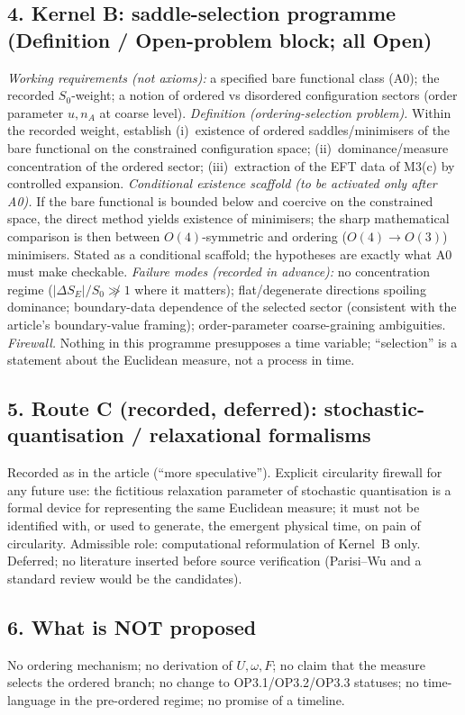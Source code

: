 \subsection*{4. Kernel B: saddle-selection programme
(Definition / Open-problem block; all Open)}
\emph{Working requirements (not axioms):} a specified bare
functional class (A0); the recorded $S_0$-weight; a notion of
ordered vs disordered configuration sectors (order parameter
$u,n_A$ at coarse level).
\emph{Definition (ordering-selection problem).}
Within the recorded weight, establish (i)~existence of ordered
saddles/minimisers of the bare functional on the constrained
configuration space; (ii)~dominance/measure concentration of the
ordered sector; (iii)~extraction of the EFT data of M3(c) by
controlled expansion.
\emph{Conditional existence scaffold (to be activated only after
A0).}
If the bare functional is bounded below and coercive on the
constrained space, the direct method yields existence of
minimisers; the sharp mathematical comparison is then between
$O(4)$-symmetric and ordering ($O(4)\to O(3)$) minimisers.
Stated as a conditional scaffold; the hypotheses are exactly what
A0 must make checkable.
\emph{Failure modes (recorded in advance):}
no concentration regime ($|\Delta S_E|/S_0\not\gg1$ where it
matters); flat/degenerate directions spoiling dominance;
boundary-data dependence of the selected sector (consistent with
the article's boundary-value framing); order-parameter
coarse-graining ambiguities.
\emph{Firewall.}
Nothing in this programme presupposes a time variable; ``selection''
is a statement about the Euclidean measure, not a process in time.

\subsection*{5. Route C (recorded, deferred): stochastic-quantisation
/ relaxational formalisms}
Recorded as in the article (``more speculative'').
Explicit circularity firewall for any future use: the fictitious
relaxation parameter of stochastic quantisation is a formal device
for representing the same Euclidean measure; it must not be
identified with, or used to generate, the emergent physical time,
on pain of circularity.
Admissible role: computational reformulation of Kernel~B only.
Deferred; no literature inserted before source verification
(Parisi--Wu and a standard review would be the candidates).

\subsection*{6. What is NOT proposed}
No ordering mechanism; no derivation of $U,\omega,F$; no claim
that the measure selects the ordered branch; no change to
OP3.1/OP3.2/OP3.3 statuses; no time-language in the pre-ordered
regime; no promise of a timeline.


